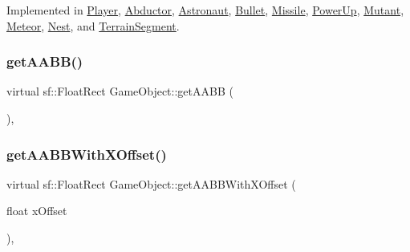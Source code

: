 Implemented in \hyperlink{class_player_ad977242aa8bda63737df338b5095a931}{Player}, \hyperlink{class_abductor_a6c68ecc2673674040f87c2409d8505a1}{Abductor}, \hyperlink{class_astronaut_ab37c4cce5348d86be1ec5ee652f5c917}{Astronaut}, \hyperlink{class_bullet_ae3696edcf0c726c8c1b18a62faef8c03}{Bullet}, \hyperlink{class_missile_a51c591552a2faedc78c524ea8ed3d770}{Missile}, \hyperlink{class_power_up_a4ddb447c9a6bdf1475bc2334590ba55e}{Power\+Up}, \hyperlink{class_mutant_a540fbecede166bd9c4ac68cbed72bc92}{Mutant}, \hyperlink{class_meteor_a6b3dc73ecbbf31c6869f7e79e0e266cc}{Meteor}, \hyperlink{class_nest_a43f88fdd7366b39bd7614f26433afe10}{Nest}, and \hyperlink{class_terrain_segment_ad9832f83e328b50f647bb844846fb095}{Terrain\+Segment}.

\hypertarget{class_game_object_a4f5a473c0deffd85dc208d552cdb9018}{}\label{class_game_object_a4f5a473c0deffd85dc208d552cdb9018} 
\subsubsection{\texorpdfstring{get\+A\+A\+B\+B()}{getAABB()}}
{\footnotesize\ttfamily virtual sf\+::\+Float\+Rect Game\+Object\+::get\+A\+A\+BB (\begin{DoxyParamCaption}{ }\end{DoxyParamCaption})\hspace{0.3cm}{\ttfamily [inline]}, {\ttfamily [virtual]}}

\hypertarget{class_game_object_a9d66c8590666d763d5fa0d380f534e3a}{}\label{class_game_object_a9d66c8590666d763d5fa0d380f534e3a} 
\subsubsection{\texorpdfstring{get\+A\+A\+B\+B\+With\+X\+Offset()}{getAABBWithXOffset()}}
{\footnotesize\ttfamily virtual sf\+::\+Float\+Rect Game\+Object\+::get\+A\+A\+B\+B\+With\+X\+Offset (\begin{DoxyParamCaption}\item[{float}]{x\+Offset }\end{DoxyParamCaption})\hspace{0.3cm}{\ttfamily [inline]}, {\ttfamily [virtual]}}

